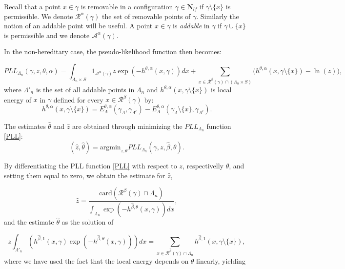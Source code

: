 Recall that a point $x\in\gamma$ is removable in a configuration $\gamma\in\mathbf N_{lf}$ if $\gamma\setminus\{x\}$ is permissible. We denote $\mathcal R^\alpha(\gamma)$ the set of removable points of $\gamma$. Similarly the notion of an addable point will be useful. A point $x\in\gamma$ is \textit{addable} in $\gamma$ if $\gamma \cup \{x\}$ is permissible and we denote $\mathcal A^\alpha(\gamma)$.

In the non-hereditary case, the pseudo-likelihood function then becomes:

\begin{equation}\label{PLL}
	PLL_{\Lambda_n}(\gamma,z,\theta, \alpha) = \int_{\Lambda_n\times S} 1_{\mathcal A^\alpha(\gamma)} z \exp (-h^{\theta,\alpha}(x,\gamma)) dx + \sum_{x\in\mathcal R^\beta(\gamma)\cap (\Lambda_n\times S)} \big(h^{\theta,\alpha}(x,\gamma\setminus\{x\}) - \ln(z)\big),
\end{equation}
where $\Lambda'_n$ is the set of all addable points in $\Lambda_n$ and $h^{\theta,\alpha}(x, \gamma \setminus \{x\})$ is local energy of $x$ in $\gamma$ defined for every $x\in\mathcal R^\beta(\gamma)$ by:
$$h^{\theta,\alpha}(x, \gamma \setminus \{x\}) = E^{\theta,\alpha}_\Lambda(\gamma_\Lambda, \gamma_{\Lambda^c}) - E^{\theta,\alpha}_\Lambda(\gamma_\Lambda\setminus\{x\}, \gamma_{\Lambda^c}).$$

The estimates $\hat\theta$ and $\hat z$ are obtained through minimizing the $PLL_{\Lambda_n}$ function \ref{PLL}:
$$(\hat z, \hat\theta) = \text{argmin}_{z,\theta} PLL_{\Lambda_n} (\gamma, z, \hat\beta,\theta).$$

By differentiating the PLL function \ref{PLL} with respect to $z$, respectivelly $\theta$, and setting them equal to zero, we obtain the estimate for $\hat z$,

\begin{equation}\label{z_hat}
\hat z = \frac{\mbox{card}(\mathcal R^\beta(\gamma)\cap \Lambda_n)}{\int_{\Lambda_n} \exp{\left( -h^{\hat\beta,\theta}(x,\gamma)\right)} dx},
\end{equation}
and the estimate $\hat\theta$ as the solution of

\begin{equation}\label{theta_hat} 
z \int_{\Lambda'_n} (h^{\hat\beta,1}(x,\gamma)\exp{\left(-h^{\hat\beta,\theta}(x,\gamma)\right)}) dx = \sum_{x \in \mathcal R^{\hat\beta}(\gamma)\cap \Lambda_n} h^{\hat\beta,1}(x,\gamma\setminus\{x\}),
\end{equation}
where we have used the fact that the local energy depends on $\theta$ linearly, yielding

